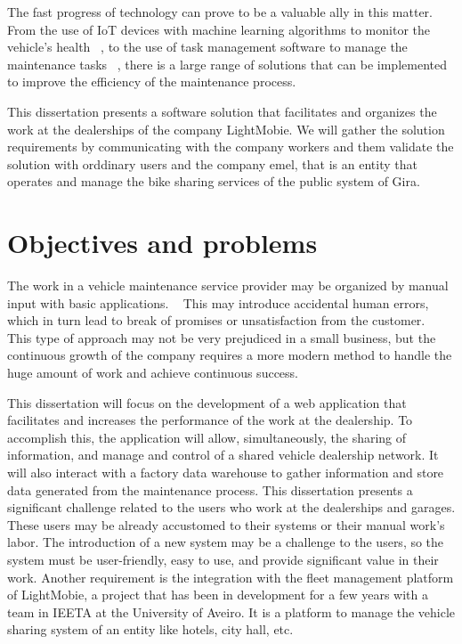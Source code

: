 The fast progress of technology can prove to be a valuable ally in this matter. 
From the use of IoT devices with machine learning algorithms to monitor the vehicle's health ~\cite{Vasavi2021}, 
to the use of task management software to manage the maintenance tasks ~\cite{MAS_MOTORS}, 
there is a large range of solutions that can be implemented to improve the efficiency of the maintenance process.

This dissertation presents a software solution that facilitates and organizes the work at the dealerships of the company LightMobie. We will gather the solution requirements by communicating with the company workers and them validate the solution with orddinary users and the company \acs{emel}, that is an entity that operates and manage the bike sharing services of the public system of Gira.


\section{Objectives and problems}

The work in a vehicle maintenance service provider may be organized by manual input with basic applications. ~\cite{MAS_MOTORS} 
This may introduce accidental human errors, which in turn lead to break of promises or unsatisfaction from the customer. ~\cite{MAS_MOTORS} ~\cite{Setting_the_after_sale_process}
This type of approach may not be very prejudiced in a small business, but the continuous growth of the company requires a more modern method to handle the huge amount of work and achieve continuous success. ~\cite{MAS_MOTORS}

This dissertation will focus on the development of a web application that facilitates and increases the performance of the work at the dealership.
To accomplish this, the application will allow, simultaneously, the sharing of information, and manage and control of a shared vehicle dealership network.
It will also interact with a factory data warehouse to gather information and store data generated from the maintenance process. 
This dissertation presents a significant challenge related to the users who work at the dealerships and garages. 
These users may be already accustomed to their systems or their manual work's labor.  
The introduction of a new system may be a challenge to the users, so the system must be user-friendly, easy to use, and provide significant value in their work.
Another requirement is the integration with the fleet management platform of LightMobie, a project that has been in development for a few years with a team in \ac{IEETA} at the University of Aveiro.
It is a platform to manage the vehicle sharing system of an entity like hotels, city hall, etc.  

